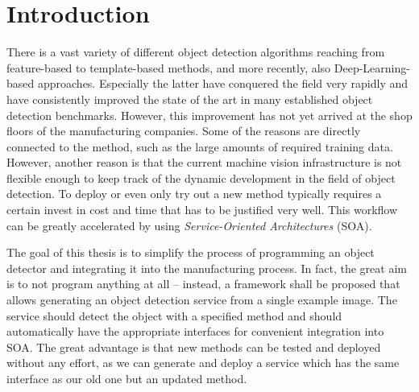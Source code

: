 \chapter{Introduction\label{cha:chapter1}}
There is a vast variety of different object detection algorithms reaching from feature-based to template-based methods, and more recently, also Deep-Learning-based approaches. Especially the latter have conquered the field very rapidly and have consistently improved the state of the art in many established object detection benchmarks. However, this improvement has not yet arrived at the shop floors of the manufacturing companies. Some of the reasons are directly connected to the method, such as the large amounts of required training data. However, another reason is that the current machine vision infrastructure is not flexible enough to keep track of the dynamic development in the field of object detection. To deploy or even only try out a new method typically requires a certain invest in cost and time that has to be justified very well. This workflow can be greatly accelerated by using \textit{Service-Oriented Architectures} (SOA).

The goal of this thesis is to simplify the process of programming an object detector and integrating it into the manufacturing process. In fact, the great aim is to not program anything at all – instead, a framework shall be proposed that allows generating an object detection service from a single example image.
The service should detect the object with a specified method and should automatically have the appropriate interfaces for convenient integration into SOA. The great advantage is that new methods can be tested and deployed without any effort, as we can generate and deploy a service which has the same interface as our old one but an updated method.
 